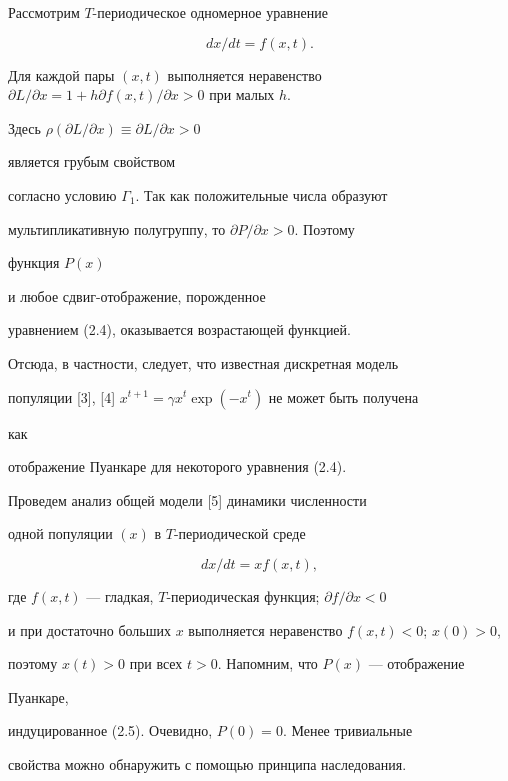  


\begin{exam} 


Рассмотрим $T$-периодическое одномерное уравнение 


\begin{equation} 


d x/d t=f(x,t). 


\end{equation} 


Для каждой пары $(x,t)$ выполняется неравенство $\partial L/\partial 


x=1+h\partial f(x,t)/\partial x>0$ при малых $h$.


Здесь $\rho(\partial L/\partial x)\equiv\partial L/\partial x>0$ 


является грубым свойством 


согласно условию $\Gamma_1$. Так как положительные числа образуют 


мультипликативную полугруппу, то $\partial P/\partial x>0$. Поэтому 


функция $P(x)$ 


и любое сдвиг-отображение, порожденное 


уравнением (2.4), оказывается возрастающей функцией. 


\end{exam} 


 


Отсюда, в частности, следует, что известная дискретная модель 


популяции [3], [4] $x^{t+1}=\gamma x^t\exp(-x^t)$ не может быть получена 


как 


отображение Пуанкаре для некоторого уравнения (2.4). 


 


\begin{exam} 


Проведем анализ общей модели [5] динамики численности 


одной популяции $(x)$ в $T$-периодической среде 


\begin{equation} 


d x/d t=x f(x,t), 


\end{equation} 


где $f(x,t)$ --- гладкая, $T$-периодическая функция; $\partial f/\partial x<0$


и при достаточно больших $x$ выполняется неравенство $f(x,t)<0$; $x(0)>0$, 


поэтому $x(t)>0$ при всех $t>0$. Напомним, что $P(x)$ --- отображение 


Пуанкаре, 


индуцированное (2.5). Очевидно, $P(0)=0$. Менее тривиальные 


свойства можно обнаружить с помощью принципа наследования. 


\end{exam} 


